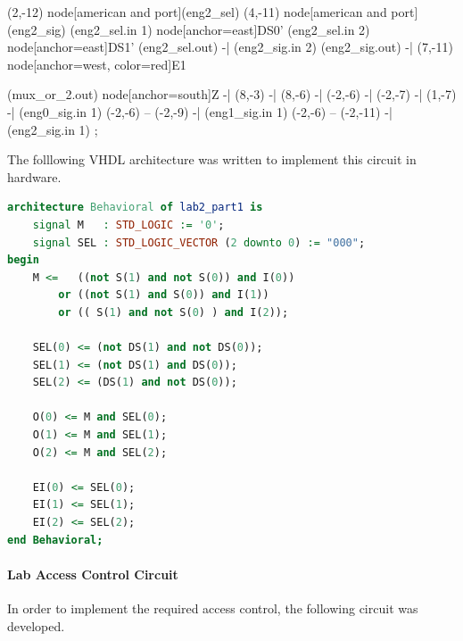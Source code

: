 \documentclass{article}
\begin{document}
\begin{circuitikz}[scale=0.75, transform shape]
            (2,-12) node[american and port](eng2_sel){}
            (4,-11) node[american and port](eng2_sig){}
            (eng2_sel.in 1) node[anchor=east]{DS0'}
            (eng2_sel.in 2) node[anchor=east]{DS1'}
            (eng2_sel.out) -| (eng2_sig.in 2){}
            (eng2_sig.out) -| (7,-11) node[anchor=west, color=red]{E1}


            (mux_or_2.out) node[anchor=south]{Z} -| (8,-3) -| (8,-6)
            -| (-2,-6) -| (-2,-7) -| (1,-7) -| (eng0_sig.in 1)
            (-2,-6) -- (-2,-9) -| (eng1_sig.in 1)
            (-2,-6) -- (-2,-11) -| (eng2_sig.in 1)
        ;
    \end{circuitikz}

    The folllowing VHDL architecture was written to implement this circuit in hardware.

    \begin{lstlisting}[language=VHDL]
architecture Behavioral of lab2_part1 is
    signal M   : STD_LOGIC := '0';
    signal SEL : STD_LOGIC_VECTOR (2 downto 0) := "000";
begin
    M <=   ((not S(1) and not S(0)) and I(0))
        or ((not S(1) and S(0)) and I(1))
        or (( S(1) and not S(0) ) and I(2));
    
    SEL(0) <= (not DS(1) and not DS(0));
    SEL(1) <= (not DS(1) and DS(0));
    SEL(2) <= (DS(1) and not DS(0)); 
    
    O(0) <= M and SEL(0);
    O(1) <= M and SEL(1);
    O(2) <= M and SEL(2);
    
    EI(0) <= SEL(0);
    EI(1) <= SEL(1);
    EI(2) <= SEL(2);
end Behavioral;
    \end{lstlisting}
    \newpage

    \paragraph{Lab Access Control Circuit}
    In order to implement the required access control, the following circuit was developed.
\end{document}
